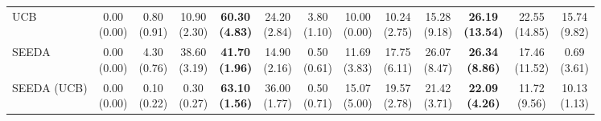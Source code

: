 \begin{table}[H]
{\begin{tabular}{l|cccccc|cccccc}
UCB & \makecell{0.00 \\ (0.00)} & \makecell{0.80 \\ (0.91)} & {\cellcolor[HTML]{C8E6C9}} \makecell{10.90 \\ (2.30)} & \bfseries \makecell{60.30 \\ (4.83)} & \makecell{24.20 \\ (2.84)} & \makecell{3.80 \\ (1.10)} & \makecell{10.00 \\ (0.00)} & \makecell{10.24 \\ (2.75)} & {\cellcolor[HTML]{C8E6C9}} \makecell{15.28 \\ (9.18)} & \bfseries \makecell{26.19 \\ (13.54)} & \makecell{22.55 \\ (14.85)} & \makecell{15.74 \\ (9.82)} \\
SEEDA & \makecell{0.00 \\ (0.00)} & \makecell{4.30 \\ (0.76)} & {\cellcolor[HTML]{C8E6C9}} \makecell{38.60 \\ (3.19)} & \bfseries \makecell{41.70 \\ (1.96)} & \makecell{14.90 \\ (2.16)} & \makecell{0.50 \\ (0.61)} & \makecell{11.69 \\ (3.83)} & \makecell{17.75 \\ (6.11)} & {\cellcolor[HTML]{C8E6C9}} \makecell{26.07 \\ (8.47)} & \bfseries \makecell{26.34 \\ (8.86)} & \makecell{17.46 \\ (11.52)} & \makecell{0.69 \\ (3.61)} \\
SEEDA (UCB) & \makecell{0.00 \\ (0.00)} & \makecell{0.10 \\ (0.22)} & {\cellcolor[HTML]{C8E6C9}} \makecell{0.30 \\ (0.27)} & \bfseries \makecell{63.10 \\ (1.56)} & \makecell{36.00 \\ (1.77)} & \makecell{0.50 \\ (0.71)} & \makecell{15.07 \\ (5.00)} & \makecell{19.57 \\ (2.78)} & {\cellcolor[HTML]{C8E6C9}} \makecell{21.42 \\ (3.71)} & \bfseries \makecell{22.09 \\ (4.26)} & \makecell{11.72 \\ (9.56)} & \makecell{10.13 \\ (1.13)} \\

\end{tabular}}
\end{table}

